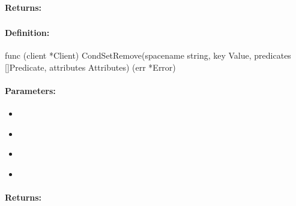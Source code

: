 \paragraph{Returns:}


\pagebreak
\subsubsection{}
\label{api:Go:CondSetRemove}


\paragraph{Definition:}
\begin{gocode}
func (client *Client) CondSetRemove(spacename string, key Value, predicates []Predicate, attributes Attributes) (err *Error)
\end{gocode}

\paragraph{Parameters:}
\begin{itemize}[noitemsep]
\item {}\\

\item {}\\

\item {}\\

\item {}\\

\end{itemize}

\paragraph{Returns:}


\pagebreak
\subsubsection{}
\label{api:Go:GroupSetRemove}


